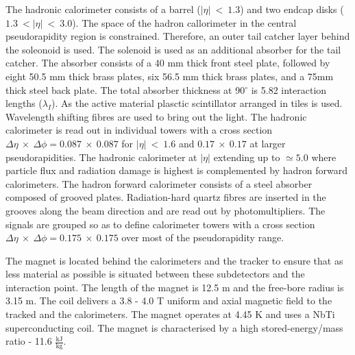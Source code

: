 The hadronic calorimeter \cite{HCAL_report} consists of a barrel ($\left|\eta\right|\ <\ 1.3$) and two endcap disks ($1.3\ <\left|\eta\right|\ <\ 3.0$). The space of the hadron callorimeter in the central pseudorapidity region is constrained. Therefore, an outer tail catcher layer behind the soleonoid is used. The solenoid is used as an additional absorber for the tail catcher. The absorber consists of a 40 mm thick front steel plate, followed by eight 50.5 mm thick brass plates, six 56.5 mm thick brass plates, and a 75mm thick steel back plate. The total absorber thickness at 90$^{\circ}$ is 5.82 interaction lengths ($\lambda_{I}$). As the active material plasctic scintillator arranged in tiles is used. Wavelength shifting fibres are used to bring out the light. The hadronic calorimeter is read out in individual towers with a cross section $\Delta\eta\ \times\ \Delta\phi=0.087\ \times\ 0.087$ for $\left|\eta\right|\ <\ 1.6$ and $0.17\ \times\ 0.17$ at larger pseudorapidities. The hadronic calorimeter at  $\left|\eta\right|$ extending up to $\simeq5.0$ where particle flux and radiation damage is highest is complemented by hadron forward calorimeters. The hadron forward calorimeter consists of a steel absorber composed of grooved plates. Radiation-hard quartz fibres are inserted in the grooves along the beam direction and are read out by photomultipliers. The signals are grouped so as to define calorimeter towers with a cross section $\Delta\eta\ \times\ \Delta\phi=0.175\ \times\ 0.175$ over most of the pseudorapidity range. 

The magnet is located behind the calorimeters and the tracker to ensure that as less material as possible is situated between these subdetectors and the interaction point. The length of the magnet is 12.5 m and the free-bore radius is 3.15 m. The coil delivers a 3.8 - 4.0 T uniform and axial magnetic field to the tracked and the calorimeters. The magnet operates at 4.45 K and uses a NbTi superconducting coil. The magnet is characterised by a high stored-energy/mass ratio - 11.6 $\frac{\text{kJ}}{\text{kg}}$.

